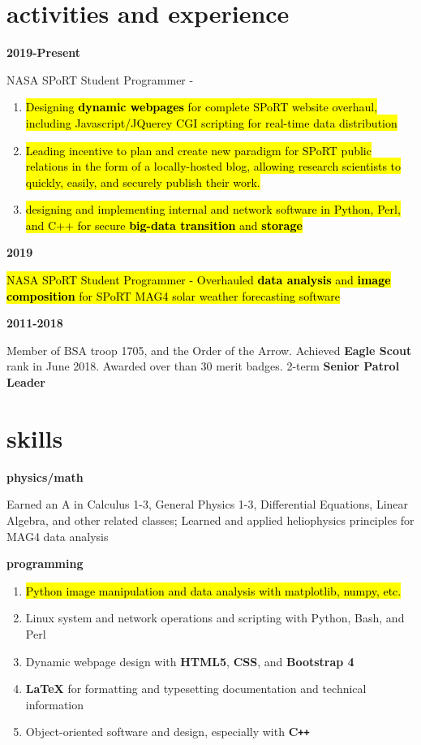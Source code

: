 \documentclass[9pt]{article}
\newcommand{\entry}[2]{
	\begin{minipage}[c]{.14\textwidth}
		{\small\textbf{#1}}\hfill
	\end{minipage}
	{\color{OliveGreen}\hfill \vline \hfill}
	\begin{minipage}[c]{.8\textwidth}
		#2
	\end{minipage}\vspace{.12in}
	}
\begin{document}
\section{activities and experience}
\textit{}

	\entry{2019-Present}{NASA SPoRT Student Programmer -

	\begin{enumerate}
		\item{\hl{Designing \textbf{dynamic webpages} for complete SPoRT website overhaul, including Javascript/JQuerey CGI scripting for real-time data distribution}}

		\item{\hl{Leading incentive to plan and create new paradigm for SPoRT public relations in the form of a locally-hosted blog, allowing research scientists to quickly, easily, and securely publish their work.}}

		\item{\hl{designing and implementing internal and network software in Python, Perl, and C++ for secure \textbf{big-data transition} and \textbf{storage}}}
	\end{enumerate}
	}

	\entry{2019}{\hl{NASA SPoRT Student Programmer - Overhauled \textbf{data analysis} and \textbf{image composition} for SPoRT MAG4 solar weather forecasting software}}

	\entry{2011-2018}{Member of BSA troop 1705, and the Order of the Arrow. Achieved \textbf{Eagle Scout} rank in June 2018. Awarded over than 30 merit badges. 2-term \textbf{Senior Patrol Leader}}

\section{skills}
\textit{}

	\entry{physics/math}{Earned an A in Calculus 1-3, General Physics 1-3, Differential Equations, Linear Algebra, and other related classes; Learned and applied heliophysics principles for MAG4 data analysis}

	\entry{programming}{
		\begin{enumerate}
			\item{\hl{Python image manipulation and data analysis with matplotlib, numpy, etc.}}
			\item{Linux system and network operations and scripting with Python, Bash, and Perl}
			\item{Dynamic webpage design with \textbf{HTML5}, \textbf{CSS}, and \textbf{Bootstrap 4}}
			\item{\textbf{LaTeX} for formatting and typesetting documentation and technical information}
			\item{Object-oriented software and design, especially with \textbf{C\texttt{++}}}
		\end{enumerate}
	}
\end{document}
